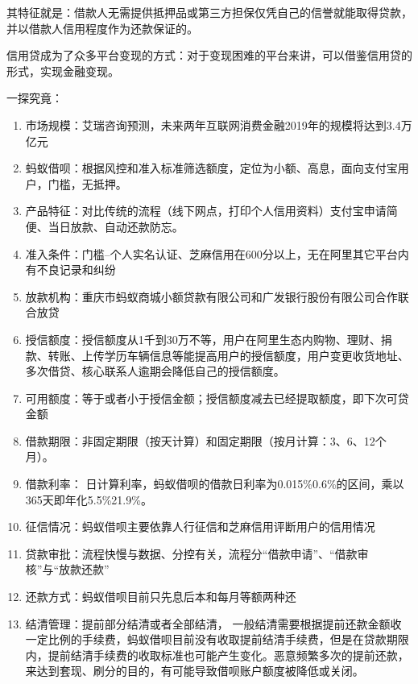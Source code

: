 \documentclass[letterpaper,11pt,english]{sphinxmanual}
\begin{document}
其特征就是：借款人无需提供抵押品或第三方担保仅凭自己的信誉就能取得贷款，并以借款人信用程度作为还款保证的。

信用贷成为了众多平台变现的方式：对于变现困难的平台来讲，可以借鉴信用贷的形式，实现金融变现。

一探究竟：
\begin{enumerate}
%
\item {} 
市场规模：艾瑞咨询预测，未来两年互联网消费金融2019年的规模将达到3.4万亿元

\item {} 
蚂蚁借呗：根据风控和准入标准筛选额度，定位为小额、高息，面向支付宝用户，门槛，无抵押。

\item {} 
产品特征：对比传统的流程（线下网点，打印个人信用资料）支付宝申请简便、当日放款、自动还款防忘。

\item {} 
准入条件：门槛–个人实名认证、芝麻信用在600分以上，无在阿里其它平台内有不良记录和纠纷

\item {} 
放款机构：重庆市蚂蚁商城小额贷款有限公司和广发银行股份有限公司合作联合放贷

\item {} 
授信额度：授信额度从1千到30万不等，用户在阿里生态内购物、理财、捐款、转账、上传学历车辆信息等能提高用户的授信额度，用户变更收货地址、多次借贷、核心联系人逾期会降低自己的授信额度。

\item {} 
可用额度：等于或者小于授信金额；授信额度减去已经提取额度，即下次可贷金额

\item {} 
借款期限：非固定期限（按天计算）和固定期限（按月计算：3、6、12个月）。

\item {} 
借款利率：
日计算利率，蚂蚁借呗的借款日利率为0.015\%\sphinxhyphen{}0.6\%的区间，乘以365天即年化5.5\%\sphinxhyphen{}21.9\%。

\item {} 
征信情况：蚂蚁借呗主要依靠人行征信和芝麻信用评断用户的信用情况

\item {} 
贷款审批：流程快慢与数据、分控有关，流程分“借款申请”、“借款审核”与“放款还款”

\item {} 
还款方式：蚂蚁借呗目前只先息后本和每月等额两种还

\item {} 
结清管理：提前部分结清或者全部结清，
一般结清需要根据提前还款金额收一定比例的手续费，蚂蚁借呗目前没有收取提前结清手续费，但是在贷款期限内，提前结清手续费的收取标准也可能产生变化。恶意频繁多次的提前还款，来达到套现、刷分的目的，有可能导致借呗账户额度被降低或关闭。


\end{enumerate}
\end{document}
